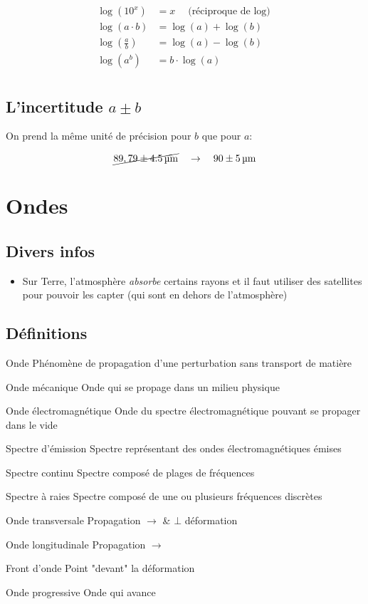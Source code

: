 \documentclass{article}
\newenvironment{definitions}{\begin{description}[leftmargin=!,labelwidth=\widthof{\bfseries Lorem ipsum dolor}]}{\end{description}}
\begin{document}
\begin{equation*}
    \begin{split}
        \log (10^x) &= x \quad \text{(réciproque de $\log$)}\\
        \log (a \cdot b) &= \log (a) + \log (b) \\
        \log (\frac{a}{b}) &= \log (a) - \log (b) \\
        \log (a^b) &= b \cdot \log (a)\\
    \end{split}
\end{equation*}
\subsection{L'incertitude $a \pm b$}
On prend la même unité de précision pour $b$ que pour $a$:

$$\cancel{89,79 \pm \SI{4,5}{\micro\meter}} \quad\to\quad 90 \pm \SI{5}{\micro\meter}$$


\newpage
\section{Ondes}

\subsection{Divers infos}

\begin{itemize}
    \item Sur Terre, l'atmosphère \textit{absorbe} certains rayons et il faut utiliser des satellites pour pouvoir les capter (qui sont en dehors de l'atmosphère)
\end{itemize}

\subsection{Définitions}

\begin{definitions}
\item[Onde]
Phénomène de propagation d'une perturbation sans transport de matière
\item[Onde mécanique]
Onde qui se propage dans un milieu physique
\item[Onde électromagnétique]
Onde du spectre électromagnétique pouvant se propager dans le vide
\item[Spectre d'émission]
Spectre représentant des ondes électromagnétiques émises
\item[Spectre continu]
Spectre composé de plages de fréquences
\item[Spectre à raies]
Spectre composé de une ou plusieurs fréquences discrètes
\item[Onde transversale]
Propagation $\to$ \& $\bot$ déformation
\item[Onde longitudinale]
Propagation $\to$
\item[Front d'onde] 
Point "devant" la déformation
\item[Onde progressive]
Onde qui avance
\end{definitions}
\end{document}
